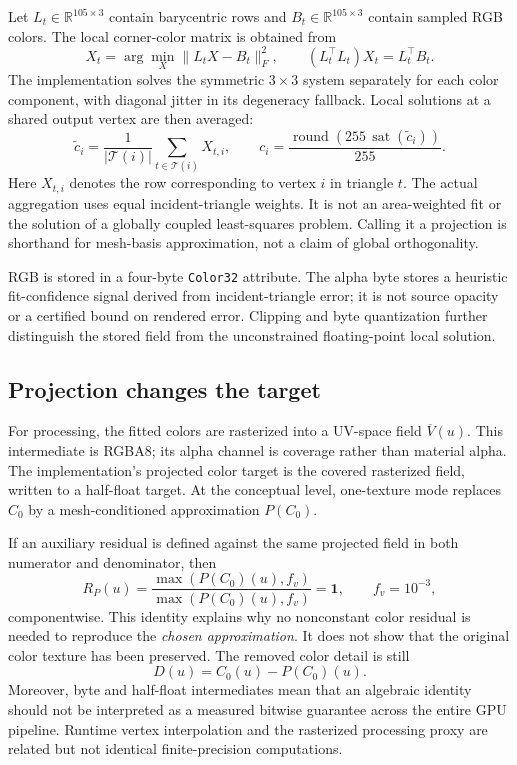 \documentclass[11pt,letterpaper]{article}
\newcommand{\sat}{\operatorname{sat}}
\newcommand{\R}{\mathbb{R}}
\newcommand{\one}{\mathbf{1}}
\newcommand{\rasterv}{\overline{V}}
\newcommand{\code}[1]{\texttt{#1}}
\begin{document}
Let $L_t\in\R^{105\times3}$ contain barycentric rows and $B_t\in\R^{105\times3}$ contain sampled RGB colors. The local corner-color matrix is obtained from
\begin{equation}
X_t=\arg\min_X\|L_tX-B_t\|_F^2,
\qquad (L_t^\top L_t)X_t=L_t^\top B_t.
\label{eq:fit}
\end{equation}
The implementation solves the symmetric $3\times3$ system separately for each color component, with diagonal jitter in its degeneracy fallback. Local solutions at a shared output vertex are then averaged:
\begin{equation}
\widetilde c_i=\frac{1}{|\mathcal T(i)|}\sum_{t\in\mathcal T(i)}X_{t,i},
\qquad c_i=\frac{\operatorname{round}(255\,\sat(\widetilde c_i))}{255}.
\label{eq:quantvertex}
\end{equation}
Here $X_{t,i}$ denotes the row corresponding to vertex $i$ in triangle $t$. The actual aggregation uses equal incident-triangle weights. It is not an area-weighted fit or the solution of a globally coupled least-squares problem. Calling it a projection is shorthand for mesh-basis approximation, not a claim of global orthogonality.

RGB is stored in a four-byte \code{Color32} attribute. The alpha byte stores a heuristic fit-confidence signal derived from incident-triangle error; it is not source opacity or a certified bound on rendered error. Clipping and byte quantization further distinguish the stored field from the unconstrained floating-point local solution.

\subsection{Projection changes the target}
For processing, the fitted colors are rasterized into a UV-space field $\rasterv(u)$. This intermediate is RGBA8; its alpha channel is coverage rather than material alpha. The implementation's projected color target is the covered rasterized field, written to a half-float target. At the conceptual level, one-texture mode replaces $C_0$ by a mesh-conditioned approximation $P(C_0)$.

If an auxiliary residual is defined against the same projected field in both numerator and denominator, then
\begin{equation}
R_P(u)=\frac{\max(P(C_0)(u),f_v)}{\max(P(C_0)(u),f_v)}=\one,
\qquad f_v=10^{-3},
\label{eq:identity}
\end{equation}
componentwise. This identity explains why no nonconstant color residual is needed to reproduce the \emph{chosen approximation}. It does not show that the original color texture has been preserved. The removed color detail is still
\begin{equation}
D(u)=C_0(u)-P(C_0)(u).
\label{eq:removed}
\end{equation}
Moreover, byte and half-float intermediates mean that an algebraic identity should not be interpreted as a measured bitwise guarantee across the entire GPU pipeline. Runtime vertex interpolation and the rasterized processing proxy are related but not identical finite-precision computations.
\end{document}
